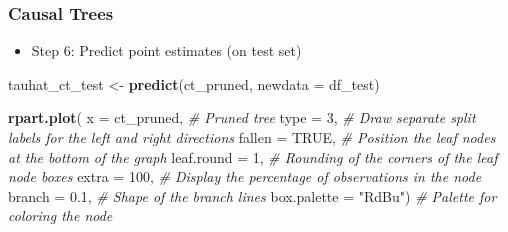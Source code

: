 \documentclass[
  shownotes,
  xcolor={svgnames},
  hyperref={colorlinks,citecolor=DarkBlue,linkcolor=DarkRed,urlcolor=DarkBlue}
  , aspectratio=169]{beamer}
\newenvironment{Shaded}{\begin{snugshade}}{\end{snugshade}}
\newcommand{\CommentTok}[1]{\textcolor[rgb]{0.56,0.35,0.01}{\textit{#1}}}
\newcommand{\DataTypeTok}[1]{\textcolor[rgb]{0.13,0.29,0.53}{#1}}
\newcommand{\DecValTok}[1]{\textcolor[rgb]{0.00,0.00,0.81}{#1}}
\newcommand{\FloatTok}[1]{\textcolor[rgb]{0.00,0.00,0.81}{#1}}
\newcommand{\KeywordTok}[1]{\textcolor[rgb]{0.13,0.29,0.53}{\textbf{#1}}}
\newcommand{\NormalTok}[1]{#1}
\newcommand{\OtherTok}[1]{\textcolor[rgb]{0.56,0.35,0.01}{#1}}
\newcommand{\StringTok}[1]{\textcolor[rgb]{0.31,0.60,0.02}{#1}}
\begin{document}
\begin{frame}[fragile]
\frametitle{Causal Trees}
\begin{itemize}
  \item Step 6: Predict point estimates (on test set)
\end{itemize}

\begin{scriptsize}


\begin{Shaded}
\begin{Highlighting}[]
\NormalTok{tauhat\_ct\_test \textless{}{-}}\StringTok{ }\KeywordTok{predict}\NormalTok{(ct\_pruned, }\DataTypeTok{newdata =}\NormalTok{ df\_test)}


\KeywordTok{rpart.plot}\NormalTok{(}
  \DataTypeTok{x =}\NormalTok{ ct\_pruned,        }\CommentTok{\# Pruned tree}
  \DataTypeTok{type =} \DecValTok{3}\NormalTok{,             }\CommentTok{\# Draw separate split labels for the left and right directions}
  \DataTypeTok{fallen =} \OtherTok{TRUE}\NormalTok{,        }\CommentTok{\# Position the leaf nodes at the bottom of the graph}
  \DataTypeTok{leaf.round =} \DecValTok{1}\NormalTok{,       }\CommentTok{\# Rounding of the corners of the leaf node boxes}
  \DataTypeTok{extra =} \DecValTok{100}\NormalTok{,          }\CommentTok{\# Display the percentage of observations in the node}
  \DataTypeTok{branch =} \FloatTok{0.1}\NormalTok{,          }\CommentTok{\# Shape of the branch lines}
  \DataTypeTok{box.palette =} \StringTok{"RdBu"}\NormalTok{) }\CommentTok{\# Palette for coloring the node}
\end{Highlighting}
\end{Shaded}
\end{scriptsize}

\end{frame}
\end{document}
